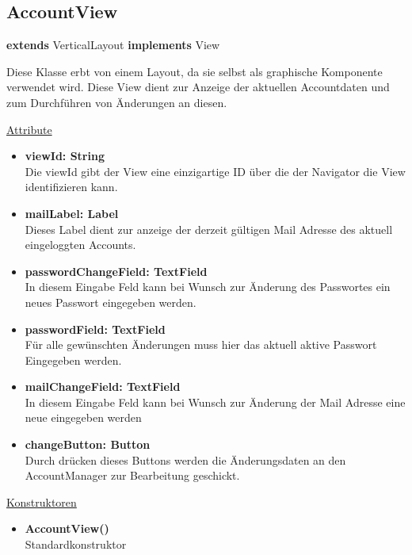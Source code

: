 \newpage
\subsection{AccountView}
\textbf{extends}  VerticalLayout \newline
\textbf{implements} View \newline

Diese Klasse erbt von einem Layout, da sie selbst als graphische Komponente verwendet wird. Diese View dient zur Anzeige der aktuellen Accountdaten und zum Durchführen von Änderungen an diesen.
\newline

\underline{Attribute}
\begin{itemize}
\itemsep0pt
\item \textbf{viewId: String} \hfill\\ 
Die viewId gibt der View eine einzigartige ID über die der Navigator die View identifizieren kann.

\item \textbf{mailLabel: Label} \hfill\\ 
Dieses Label dient zur anzeige der derzeit gültigen Mail Adresse des aktuell eingeloggten Accounts.

\item \textbf{passwordChangeField: TextField} \hfill\\ 
In diesem Eingabe Feld kann bei Wunsch zur Änderung des Passwortes ein neues Passwort eingegeben werden.

\item \textbf{passwordField: TextField} \hfill\\ 
Für alle gewünschten Änderungen muss hier das aktuell aktive Passwort Eingegeben werden.

\item \textbf{mailChangeField: TextField} \hfill\\ 
In diesem Eingabe Feld kann bei Wunsch zur Änderung der Mail Adresse eine neue eingegeben werden

\item \textbf{changeButton: Button} \hfill\\
Durch drücken dieses Buttons werden die Änderungsdaten an den AccountManager zur Bearbeitung geschickt.
\end{itemize}

\underline{Konstruktoren}
\begin{itemize}
\itemsep0pt
\item \textbf{AccountView()} \hfill\\
Standardkonstruktor
\end{itemize}


